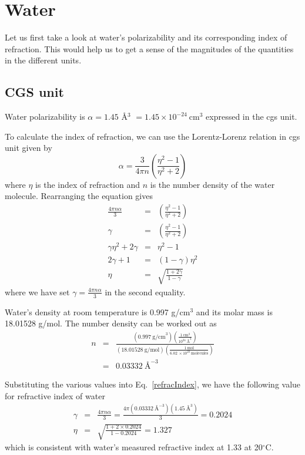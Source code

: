 \documentclass[aps, 12pt, amsmath, amssymb, onecolumn, notitlepage, nofootinbib]{revtex4-1}
\begin{document}
\section{Water}

Let us first take a look at water's polarizability and its corresponding index of refraction. This would help us to get a sense of the magnitudes of the quantities in the different units.

\subsection{CGS unit}

 Water polarizability is $\alpha = 1.45$ \AA$^3$ $= 1.45 \times 10^{-24}\ \text{cm}^3$ expressed in the cgs unit.

 To calculate the index of refraction, we can use the Lorentz-Lorenz relation in cgs unit given by
\begin{equation}
\alpha = \frac{3}{4\pi n} \left( \frac{\eta^2 - 1 }{\eta^2 +2} \right)
\end{equation}
where $\eta$ is the index of refraction and $n$ is the number density of the water molecule. Rearranging the equation gives
\begin{eqnarray}
\frac{4\pi n\alpha}{3} &=&   \left( \frac{\eta^2 - 1 }{\eta^2 +2} \right) \nonumber\\
\gamma &=&   \left( \frac{\eta^2 - 1 }{\eta^2 +2} \right) \nonumber\\
\gamma\eta^2 +2\gamma &=&  \eta^2 - 1\nonumber\\
2\gamma + 1 &=&  (1-\gamma) \eta^2\nonumber\\ 
\eta &=&  \sqrt{\frac{1 + 2\gamma}{1-\gamma}}
\label{refracIndex}
\end{eqnarray}
where we have set $\gamma = \frac{4\pi n\alpha}{3}$ in the second equality. 


Water's density at room temperature is 0.997 g/cm$^3$ and its molar mass is 18.01528 g/mol. The number density can be worked out as
\begin{eqnarray}
n &=&  \frac{(0.997\ \text{g/cm}^3) \left( \frac{1\ \text{cm}^3}{10^{24}\ \text{\AA}^3} \right)}{(18.01528\ \text{g/mol}) \left( \frac{1\ \text{mol}}{6.02\ \times 10^{23}\ \text{molecules} }\right)}\nonumber\\
&=& 0.03332\ \text{\AA}^{-3}
\label{numberDenisty}
\end{eqnarray}


Substituting the various values into Eq.~\eqref{refracIndex}, we have the following value for refractive index of water
\begin{eqnarray}
\gamma &=& \frac{4\pi n\alpha}{3} = \frac{4\pi (0.03332\ \text{\AA}^{-3})( 1.45\ \text{\AA}^3)}{3} =0.2024 \nonumber\\
\eta &=&  \sqrt{\frac{1 + 2\times 0.2024 }{1-0.2024}} = 1.327
\end{eqnarray}
which is consistent with water's measured refractive index at 1.33 at 20$^\circ$C.
\end{document}
